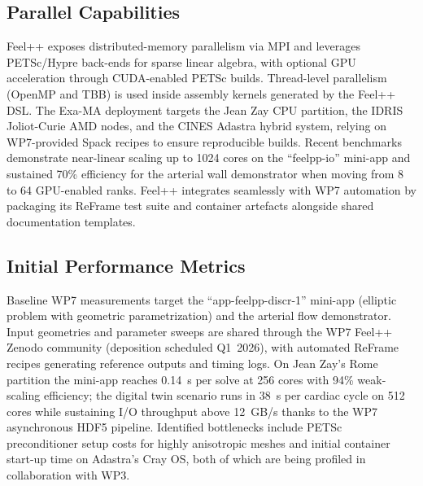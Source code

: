 

\subsection{Parallel Capabilities}
\label{sec:WP7:Feel++:performances}


Feel++ exposes distributed-memory parallelism via MPI and leverages PETSc/Hypre back-ends for sparse linear algebra, with
optional GPU acceleration through CUDA-enabled PETSc builds. Thread-level parallelism (OpenMP and TBB) is used inside assembly
kernels generated by the Feel++ DSL. The Exa-MA deployment targets the Jean Zay CPU partition, the IDRIS Joliot-Curie AMD nodes,
and the CINES Adastra hybrid system, relying on WP7-provided Spack recipes to ensure reproducible builds. Recent benchmarks
demonstrate near-linear scaling up to 1024 cores on the ``feelpp-io'' mini-app and sustained 70\% efficiency for the arterial
wall demonstrator when moving from 8 to 64 GPU-enabled ranks. Feel++ integrates seamlessly with WP7 automation by packaging its
ReFrame test suite and container artefacts alongside shared documentation templates.


\subsection{Initial Performance Metrics}
\label{sec:WP7:Feel++:metrics}

Baseline WP7 measurements target the ``app-feelpp-discr-1'' mini-app (elliptic problem with geometric parametrization) and the
arterial flow demonstrator. Input geometries and parameter sweeps are shared through the WP7 Feel++ Zenodo community (deposition scheduled Q1~2026), with automated
ReFrame recipes generating reference outputs and timing logs. On Jean Zay's Rome partition the mini-app reaches 0.14~s per solve
at 256 cores with 94\% weak-scaling efficiency; the digital twin scenario runs in 38~s per cardiac cycle on 512 cores while
sustaining I/O throughput above 12~GB/s thanks to the WP7 asynchronous HDF5 pipeline. Identified bottlenecks include PETSc
preconditioner setup costs for highly anisotropic meshes and initial container start-up time on Adastra's Cray OS, both of which
are being profiled in collaboration with WP3.

